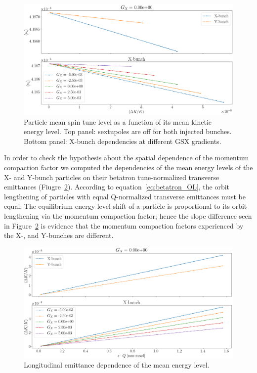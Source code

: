 \begin{figure}[h]
	\centering
	\includegraphics[height=.3\paperheight]{images/stune_traj_equ/part1/stune_vs_equ_energy}
	\caption[Mean spin tune level veresus mean kinetic energy level.]{Particle mean spin tune level
        as a function of its mean kinetic energy level. Top panel: sextupoles are off for both injected bunches.
        Bottom panel: X-bunch dependencies at different GSX gradients.\label{fig:stune_traj_equ_main}}
\end{figure}

In order to check the hypothesis about the spatial dependence of the momentum compaction factor we computed
the dependencies of the mean energy levels of the X- and Y-bunch particles on their betatron tune-normalized
transverse emittances (Fiugre~\ref{fig:equ_nrg_vs_emittance}).
According to equation~\eqref{eq:betatron_OL}, the orbit lengthening of particles with equal Q-normalized
transverse emittances must be equal. The equilibrium energy level shift of a particle is proportional to
its orbit lengthening via the momentum compaction factor; hence the slope difference seen in
Figure~\ref{fig:equ_nrg_vs_emittance} is evidence that the momentum compaction factors experienced by the
X-, and Y-bunches are different. 

\begin{figure}[h]
	\centering
	\includegraphics[height=.3\paperheight]{images/stune_traj_equ/part1/equ_energy_vs_emittance}
	\caption{Longitudinal emittance dependence of the mean energy level.\label{fig:equ_nrg_vs_emittance}}
\end{figure}

